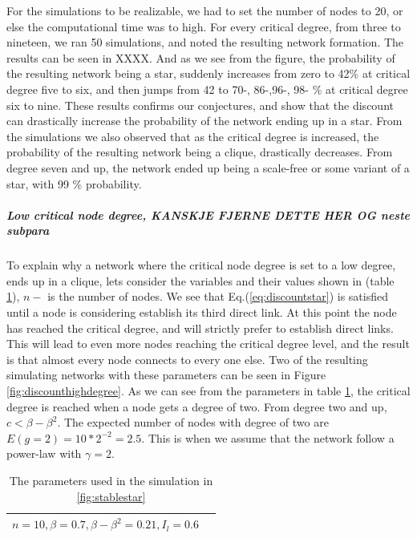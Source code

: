 For the simulations to be realizable, we had to set the number of nodes to 20, or else the computational time was to high. For every critical degree, from three to nineteen, we ran 50 simulations, and noted the resulting network formation. The results can be seen in XXXX. And as we see from the figure, the probability of the resulting network being a star, suddenly increases from zero to 42\% at critical degree five to six, and then jumps from 42 to 70-, 86-,96-, 98- \% at critical degree six to nine. These results confirms our conjectures, and show that the discount can drastically increase the probability of the network ending up in a star. 
From the simulations we also observed that as the critical degree is increased, the probability of the resulting network being a clique, drastically decreases. From degree seven and up, the network ended up being a scale-free or some variant of a star, with 99 \% probability.
\subparagraph{Low critical node degree, KANSKJE FJERNE DETTE HER OG neste subpara}
To explain why a network where the critical node degree is set to a low degree, ends up in a clique, 
 lets consider the variables and their values shown in (table \ref{tbl:clique}), $n-$ is the number of nodes. We see that Eq.(\ref{eq:discountstar}) is satisfied until a node is considering establish its third direct link. At this point the node has reached the critical degree, and will strictly prefer to establish direct links. This will lead to even more nodes reaching the critical degree level, and the result is that almost every node connects to every one else. Two of the resulting simulating networks with these parameters can be seen in Figure \ref{fig:discounthighdegree}. As we can see from the parameters in table \ref{tbl:clique}, the critical degree is reached when a node gets a degree of two. From degree two and up, $c<\beta-\beta^{2}$. The expected number of nodes with degree of two are $E(g=2)=10*2^{-2}=2.5$. This is when we assume that the network follow a power-law with $\gamma=2$.
\begin{table}[h]
\centering
\begin{tabular}{lc}
 \hline
  $
  n=10,
  \beta=0.7,
  \beta-\beta^2=0.21,
  I_{l}=0.6$\\
  \hline
\end{tabular}
\caption{The parameters used in the simulation in \ref{fig:stablestar} \label{tbl:clique}}
\end{table}

